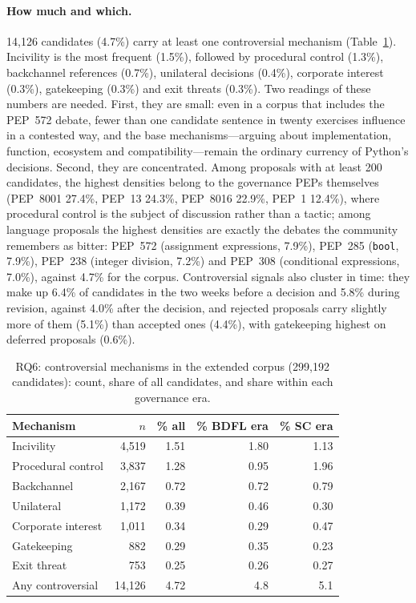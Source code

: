 \documentclass[sigconf,screen]{acmart}
\begin{document}
\paragraph{How much and which.} 14,126 candidates (4.7\%) carry at least one controversial mechanism (Table~\ref{tab:rq6}). Incivility is the most frequent (1.5\%), followed by procedural control (1.3\%), backchannel references (0.7\%), unilateral decisions (0.4\%), corporate interest (0.3\%), gatekeeping (0.3\%) and exit threats (0.3\%). Two readings of these numbers are needed. First, they are small: even in a corpus that includes the PEP~572 debate, fewer than one candidate sentence in twenty exercises influence in a contested way, and the base mechanisms---arguing about implementation, function, ecosystem and compatibility---remain the ordinary currency of Python's decisions. Second, they are concentrated. Among proposals with at least 200 candidates, the highest densities belong to the governance PEPs themselves (PEP~8001 27.4\%, PEP~13 24.3\%, PEP~8016 22.9\%, PEP~1 12.4\%), where procedural control is the subject of discussion rather than a tactic; among language proposals the highest densities are exactly the debates the community remembers as bitter: PEP~572 (assignment expressions, 7.9\%), PEP~285 (\texttt{bool}, 7.9\%), PEP~238 (integer division, 7.2\%) and PEP~308 (conditional expressions, 7.0\%), against 4.7\% for the corpus. Controversial signals also cluster in time: they make up 6.4\% of candidates in the two weeks before a decision and 5.8\% during revision, against 4.0\% after the decision, and rejected proposals carry slightly more of them (5.1\%) than accepted ones (4.4\%), with gatekeeping highest on deferred proposals (0.6\%).

\begin{table}[t]
\caption{RQ6: controversial mechanisms in the extended corpus (299,192 candidates): count, share of all candidates, and share within each governance era.}
\label{tab:rq6}
\small
\begin{tabular}{lrrrr}
\toprule
Mechanism & $n$ & \% all & \% BDFL era & \% SC era \\
\midrule
Incivility & 4,519 & 1.51 & 1.80 & 1.13 \\
Procedural control & 3,837 & 1.28 & 0.95 & 1.96 \\
Backchannel & 2,167 & 0.72 & 0.72 & 0.79 \\
Unilateral & 1,172 & 0.39 & 0.46 & 0.30 \\
Corporate interest & 1,011 & 0.34 & 0.29 & 0.47 \\
Gatekeeping & 882 & 0.29 & 0.35 & 0.23 \\
Exit threat & 753 & 0.25 & 0.26 & 0.27 \\
\midrule
Any controversial & 14,126 & 4.72 & 4.8 & 5.1 \\
\bottomrule
\end{tabular}
\end{table}
\end{document}
